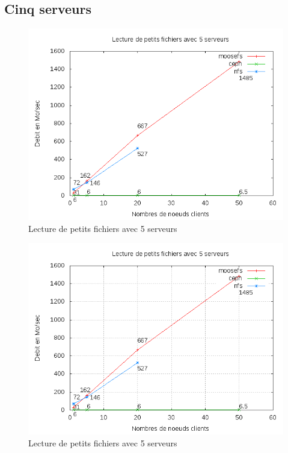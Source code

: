 \documentclass[12pt]{report}
\begin{document}
			\subsection{Cinq serveurs}
\begin{figure}[H]
\begin{center}
\includegraphics[bb=0 0 640 480,width=14cm]{images/srv5rs.png}
\caption{Lecture de petits fichiers avec 5 serveurs}
\end{center}
\end{figure} 
\begin{figure}[H]
\begin{center}
\includegraphics[bb=0 0 640 480,width=14cm]{images/srv5rs2.png}
\caption{Lecture de petits fichiers avec 5 serveurs}
\end{center}
\end{figure} 
\end{document}
